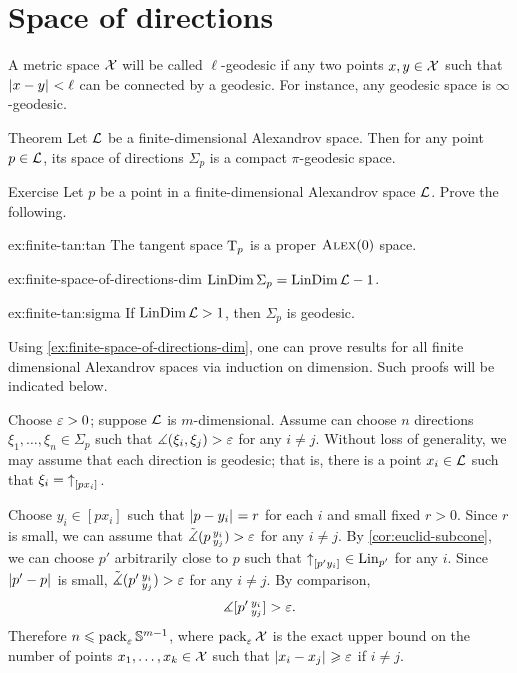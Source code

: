 \section{Space of directions}

A metric space $\mathcal{X}$ will be called $\ell$-geodesic 
if any two points $x,y\in\mathcal{X}$ such that $\dist{x}{y}{}<\ell$ can be connected by a geodesic.
For instance, any geodesic space is $\infty$-geodesic.

\begin{thm}{Theorem}\label{thm:finite-space-of-directions}
Let $\mathcal{L}$ be a finite-dimensional Alexandrov space.
Then for any point $p\in \mathcal{L}$, its space of directions $\Sigma_p$ is a compact $\pi$-geodesic space.
\end{thm}


\begin{thm}{Exercise}\label{ex:finite-tan}
Let $p$ be a point in a finite-dimensional Alexandrov space $\mathcal{L}$.
Prove the following.
\begin{subthm}{ex:finite-tan:tan}
The tangent space $\mathrm{T}_p$ is a proper $\textsc{Alex}(0)$ space.
\end{subthm}

\begin{subthm}{ex:finite-space-of-directions-dim}
$\mathop{\rm LinDim}\nolimits\Sigma_p=\mathop{\rm LinDim}\nolimits\mathcal{L}-1$.
\end{subthm}

\begin{subthm}{ex:finite-tan:sigma}
If $\mathop{\rm LinDim}\nolimits \mathcal{L}>1$, then $\Sigma_p$ is geodesic.
\end{subthm}


\end{thm}

Using \ref{ex:finite-space-of-directions-dim}, one can prove results for all finite dimensional Alexandrov spaces via induction on  dimension.
Such proofs will be indicated below.

Choose $\varepsilon>0$; suppose $\mathcal{L}$ is $m$-dimensional.
Assume can choose $n$ directions $\xi_1,\dots, \xi_n\in \Sigma_p$ such that $\mangle(\xi_i,\xi_j)\z>\eps$ for any $i\ne j$.
Without loss of generality, we may assume that each direction is geodesic;
that is, there is a point $x_i\in \mathcal{L}$ such that $\xi_i={\uparrow}_{[{p}{x_i}]_{{}}}$.

Choose $y_i\in [px_i]$ such that $\dist{p}{y_i}{}=r$ for each $i$ and small fixed $r>0$.
Since $r$ is small, we can assume that $\tilde\measuredangle(p\,{}^{y_i}_{y_j})>\varepsilon$ for any $i\ne j$.
By \ref{cor:euclid-subcone}, we can choose $p'$ arbitrarily close to $p$ such that ${\uparrow}_{[{p'}{y_i}]_{{}}}\in \mathop{\rm Lin}\nolimits_{p'}$ for any $i$.
Since  $\dist{p'}{p}{}$ is small, $\tilde\measuredangle(p'\,{}^{y_i}_{y_j})>\varepsilon$ for any $i\ne j$.
By comparison, 
\[\measuredangle [p'\,{}^{y_i}_{y_j}]>\varepsilon.\]
Therefore $n\leqslant \operatorname{\rm pack}\nolimits_\varepsilon\mathbb{S}^{m-1}$,
where $\operatorname{\rm pack}\nolimits_\varepsilon\mathcal{X}$ is the exact upper bound on the number of points $x_1,\z\dots,x_k\in \spc{X}$ such that $\dist{x_i}{x_j}{}\ge\eps$ if $i\ne j$.

